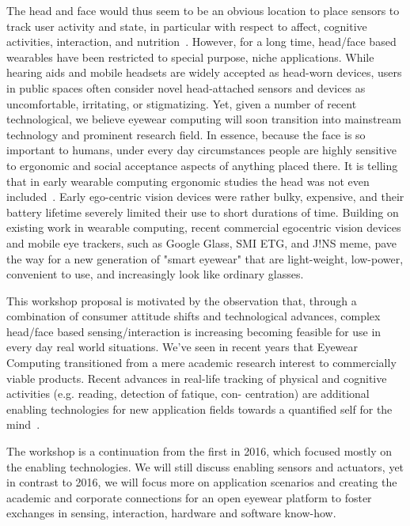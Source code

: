 \documentclass{sigchi-ext}
\begin{document}
The head and face would thus seem to be an obvious location to place sensors to track user activity and state, in particular with respect to affect, cognitive activities, interaction, and nutrition~\cite{amft2015making,kuhn2016gphysics}. However, for a long time, head/face based wearables have been restricted to special purpose, niche applications. 
While hearing aids and mobile headsets are widely accepted as head-worn devices, users in public spaces often consider novel head-attached sensors and devices as uncomfortable, irritating, or stigmatizing. Yet, given a number of recent technological, we believe eyewear computing will soon transition into mainstream technology and prominent research field. In essence, because the face is so important to humans, under every day circumstances people are highly sensitive to ergonomic and social acceptance aspects of anything placed there. It is telling that in early wearable computing ergonomic studies the head was not even included~\cite{bodine2003effects}. Early ego-centric vision devices were rather bulky, expensive, and their battery lifetime severely limited their use to short durations of time\cite{cakmakci2006head}. Building on existing work in wearable computing, recent commercial egocentric vision devices and mobile eye trackers, such as Google Glass, SMI ETG, and J!NS meme, pave the way for a new generation of "smart eyewear" that are light-weight, low-power, convenient to use, and increasingly look like ordinary glasses\cite{bulling2014cognition,kliegl2006tracking}.

This workshop proposal is motivated by the observation that, through a combination of consumer attitude shifts and technological advances, complex head/face based sensing/interaction is increasing becoming feasible for use in every day real world situations. We've seen in recent years that Eyewear Computing transitioned from a mere academic research interest to commercially viable products. Recent advances in real-life tracking of physical and cognitive activities (e.g. reading, detection of fatique, con- centration) are additional enabling technologies for new application fields towards a quantified self for the mind~\cite{kunze2015quantifying}.

 The workshop is a continuation from the first in 2016, which focused mostly on the enabling technologies. We will still discuss enabling sensors and actuators, yet in contrast to 2016, we will focus more on application scenarios and creating the academic and corporate connections for an open eyewear platform to foster exchanges in sensing, interaction, hardware and software know-how.
\end{document}
